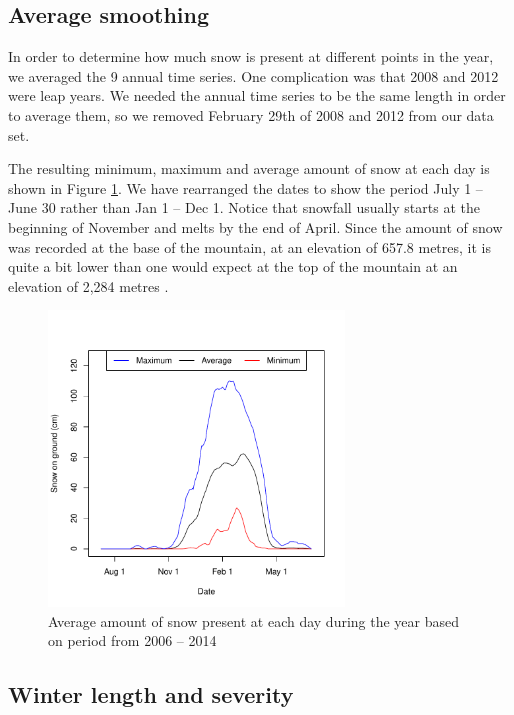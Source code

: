 \documentclass[12pt,twoside]{article}
\begin{document}
{\subsection{Average smoothing}

In order to determine how much snow is present at different points in the year, we averaged the 9 annual time series. One complication was that 2008 and 2012 were leap years. We needed the annual time series to be the same length in order to average them, so we removed February 29th of 2008 and 2012 from our data set.

The resulting minimum, maximum and average amount of snow at each day is shown in Figure \ref{fig:averagetsplot}. We have rearranged the dates to show the period July 1 -- June 30 rather than Jan 1 -- Dec 1. Notice that snowfall usually starts at the beginning of November and melts by the end of April. Since the amount of snow was recorded at the base of the mountain, at an elevation of 657.8 metres, it is quite a bit lower than one would expect at the top of the mountain at an elevation of 2,284 metres \cite{WhistlerBlackcomb}.


\begin{figure}[!ht]
\begin{center}
\includegraphics[width=0.7\textwidth]{report-averagetsplot}
\end{center}
\vspace{-5mm}
\caption{Average amount of snow present at each day during the year based on period from 2006 -- 2014}
\label{fig:averagetsplot}
\end{figure}

\subsection{Winter length and severity}

}
\end{document}
